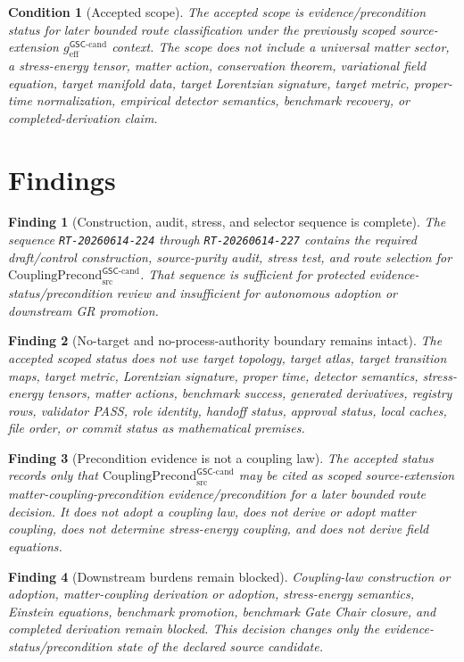 \documentclass[11pt]{article}
\newcommand{\geffCand}{g_{\mathrm{eff}}^{\mathsf{GSC}\mbox{-}\mathrm{cand}}}
\newcommand{\CouplingPrecond}{\mathrm{CouplingPrecond}^{\mathsf{GSC}\mbox{-}\mathrm{cand}}_{\mathrm{src}}}
\newtheorem{finding}{Finding}
\newtheorem{condition}{Condition}
\begin{document}
\begin{condition}[Accepted scope]
The accepted scope is evidence/precondition status for later bounded route
classification under the previously scoped source-extension \(\geffCand\)
context. The scope does not include a universal matter sector, a stress-energy
tensor, matter action, conservation theorem, variational field equation,
target manifold data, target Lorentzian signature, target metric, proper-time
normalization, empirical detector semantics, benchmark recovery, or
completed-derivation claim.
\end{condition}

\section{Findings}

\begin{finding}[Construction, audit, stress, and selector sequence is complete]
The sequence \texttt{RT-20260614-224} through \texttt{RT-20260614-227}
contains the required draft/control construction, source-purity audit, stress
test, and route selection for \(\CouplingPrecond\). That sequence is
sufficient for protected evidence-status/precondition review and insufficient
for autonomous adoption or downstream GR promotion.
\end{finding}

\begin{finding}[No-target and no-process-authority boundary remains intact]
The accepted scoped status does not use target topology, target atlas, target
transition maps, target metric, Lorentzian signature, proper time, detector
semantics, stress-energy tensors, matter actions, benchmark success,
generated derivatives, registry rows, validator PASS, role identity, handoff
status, approval status, local caches, file order, or commit status as
mathematical premises.
\end{finding}

\begin{finding}[Precondition evidence is not a coupling law]
The accepted status records only that \(\CouplingPrecond\) may be cited as
scoped source-extension matter-coupling-precondition evidence/precondition for
a later bounded route decision. It does not adopt a coupling law, does not
derive or adopt matter coupling, does not determine stress-energy coupling,
and does not derive field equations.
\end{finding}

\begin{finding}[Downstream burdens remain blocked]
Coupling-law construction or adoption, matter-coupling derivation or adoption,
stress-energy semantics, Einstein equations, benchmark promotion, benchmark
Gate Chair closure, and completed derivation remain blocked. This decision
changes only the evidence-status/precondition state of the declared source
candidate.
\end{finding}
\end{document}
